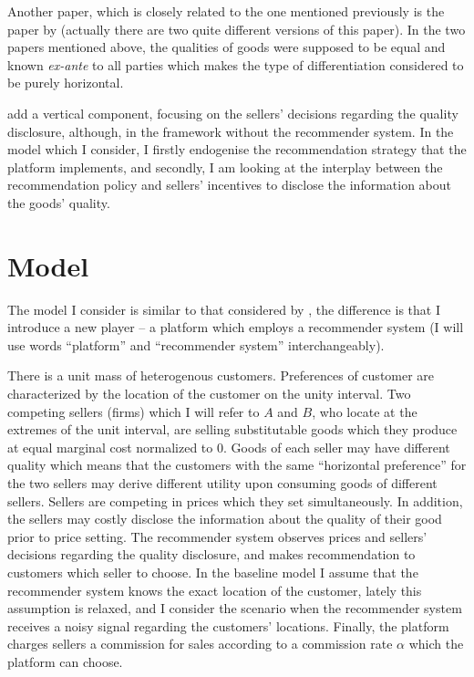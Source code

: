 \documentclass[a4paper]{article}
\begin{document}
	Another paper, which is closely related to the one mentioned previously is the paper by \cite{li2018recommender} (actually there are two quite different versions of this paper). In the two papers mentioned above, the qualities of goods were supposed to be equal and known \textit{ex-ante} to all parties which makes the type of differentiation considered to be purely horizontal.
	
	\cite{levin2009quality} add a vertical component, focusing on the sellers' decisions regarding the quality disclosure, although, in the framework without the recommender system. In the model which I consider, I firstly endogenise the recommendation strategy that the platform implements, and secondly, I am looking at the interplay between the recommendation policy and sellers' incentives to disclose the information about the goods' quality.
	
	\section{Model}
	The model I consider is similar to that considered by \cite{levin2009quality}, the difference is that I introduce a new player -- a platform which employs a recommender system (I will use words ``platform'' and ``recommender system'' interchangeably).
		
	
	There is a unit mass of heterogenous customers. Preferences of customer are characterized by the location of the customer on the unity interval. Two competing sellers (firms) which I will refer to $A$ and $B$, who locate at the extremes of the unit interval, are selling substitutable goods which they produce at equal marginal cost normalized to 0. Goods of each seller may have different quality which means that the customers with the same ``horizontal preference'' for the two sellers may derive different utility upon consuming goods of different sellers. Sellers are competing in prices which they set simultaneously. In addition, the sellers may costly disclose the information about the quality of their good prior to price setting. The recommender system observes prices and sellers' decisions regarding the quality disclosure, and makes recommendation to customers which seller to choose. In the baseline model I assume that the recommender system knows the exact location of the customer, lately this assumption is relaxed, and I consider the scenario when the recommender system receives a noisy signal regarding the customers' locations. Finally, the platform charges sellers a commission for sales according to a commission rate $\alpha$ which the platform can choose. 
	
\end{document}

